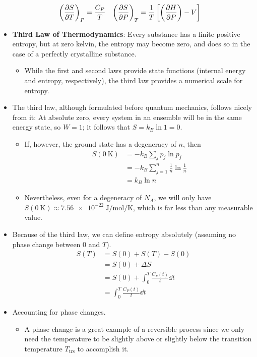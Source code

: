 \documentclass[../notes.tex]{subfiles}
\begin{document}
\begin{itemize}
    \begin{align*}
        \left( \pdv{S}{T} \right)_P &= \frac{C_P}{T}&
        \left( \pdv{S}{P} \right)_T &= \frac{1}{T}\left[ \left( \pdv{H}{P} \right)-V \right]
    \end{align*}
    \item \textbf{Third Law of Thermodynamics}: Every substance has a finite positive entropy, but at zero kelvin, the entropy may become zero, and does so in the case of a perfectly crystalline substance.
    \begin{itemize}
        \item While the first and second laws provide state functions (internal energy and entropy, respectively), the third law provides a numerical scale for entropy.
    \end{itemize}
    \item The third law, although formulated before quantum mechanics, follows nicely from it: At absolute zero, every system in an ensemble will be in the same energy state, so $W=1$; it follows that $S=k_B\ln 1=0$.
    \begin{itemize}
        \item If, however, the ground state has a degeneracy of $n$, then
        \begin{align*}
            S(\SI{0}{\kelvin}) &= -k_B\sum_jp_j\ln p_j\\
            &= -k_B\sum_{j=1}^n\frac{1}{n}\ln\frac{1}{n}\\
            &= k_B\ln n
        \end{align*}
        \item Nevertheless, even for a degeneracy of $N_A$, we will only have $S(\SI{0}{\kelvin})\approx\SI{7.56e-22}{\joule\per\mole\per\kelvin}$, which is far less than any measurable value.
    \end{itemize}
    \item Because of the third law, we can define entropy absolutely (assuming no phase change between 0 and $T$).
    \begin{align*}
        S(T) &= S(0)+S(T)-S(0)\\
        &= S(0)+\Delta S\\
        &= S(0)+\int_0^T\frac{C_P(t)}{t}\dd{t}\\
        &= \int_0^T\frac{C_P(t)}{t}\dd{t}
    \end{align*}
    \item Accounting for phase changes.
    \begin{itemize}
        \item A phase change is a great example of a reversible process since we only need the temperature to be slightly above or slightly below the transition temperature $T_\text{trs}$ to accomplish it.

\end{itemize}
\end{itemize}
\end{document}
